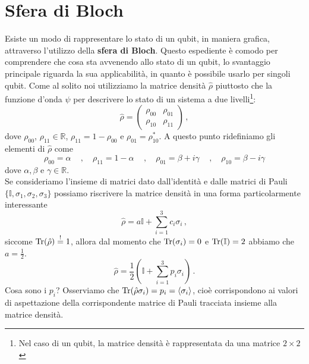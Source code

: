 \vspace{1cm}
\newline
{}
\vspace{0.5cm}
\section{Sfera di Bloch}
Esiste un modo di rappresentare lo stato di un qubit, in maniera grafica, attraverso l'utilizzo della \textbf{sfera di Bloch}. Questo espediente è comodo per comprendere che cosa sta avvenendo allo stato di un qubit, lo svantaggio principale riguarda la sua applicabilità, in quanto è possibile usarlo per singoli qubit. Come al solito noi utilizziamo la matrice densità $\hat \rho$ piuttosto che la funzione d'onda $\psi$ per descrivere lo stato di un sistema a due livelli\footnote{Nel caso di un qubit, la matrice densità è rappresentata da una matrice $2\times2$}:
\begin{equation*}
    \hat \rho = \begin{pmatrix}
                    \rho_{00} & \rho_{01} \\
                    \rho_{10} & \rho_{11}
                \end{pmatrix} \, ,
\end{equation*}
dove $\rho_{00}$, $\rho_{11} \in \mathbb{R}$, $\rho_{11}=1-\rho_{00}$ e $\rho_{01}=\rho_{10}^*$. A questo punto ridefiniamo gli elementi di $\hat \rho$ come
\begin{equation*}
    \rho_{00}=\alpha \quad \, , \quad \rho_{11}=1-\alpha \quad \, , \quad \rho_{01}=\beta + i\gamma \quad \, , \quad \rho_{10}=\beta - i \gamma
\end{equation*}
dove $\alpha, \beta$ e $\gamma \in \mathbb{R}$. \\
Se consideriamo l'insieme di matrici dato dall'identità e dalle matrici di Pauli $\{\mathbb{I}, \sigma_1, \sigma_2, \sigma_3 \}$ possiamo riscrivere la matrice densità in una forma particolarmente interessante
\begin{equation*}
    \hat \rho = a\mathbb{I} + \sum_{i=1}^3 c_i\sigma_i \, ,
\end{equation*}
siccome $\Tr(\hat \rho)\overset{!}{=}1$, allora dal momento che $\Tr(\sigma_i)=0$ e $\Tr(\mathbb{I})=2$ abbiamo che $a=\frac 12$.
\begin{equation*}
    \hat \rho = \frac 12\left(\mathbb{I}+\sum_{i=1}^3 p_i \sigma_i\right) \, .
\end{equation*}
Cosa sono i $p_i$? Osserviamo che $\Tr(\hat \rho \sigma_i)=p_i=\expval{\sigma_i}$, cioè corrispondono ai valori di aspettazione della corrispondente matrice di Pauli tracciata insieme alla matrice densità.\\
